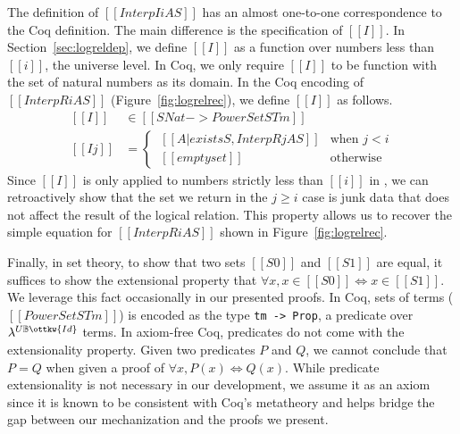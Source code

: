 \documentclass[acmsmall,screen=true,
\ifpublic review=false\else,review=true\fi
  ,anonymous=\ifanonymous true\else false\fi]{acmart}
\newcommand{\lang}{$\lambda^{U\mathbb{B}\ottkw{Id}}$\xspace}
\begin{document}
The definition of $[[Interp I i A S]]$ has an almost one-to-one
correspondence to the Coq definition. The main difference is the
specification of $[[I]]$. In
Section~\ref{sec:logreldep}, we define $[[I]]$ as a function over
numbers less than $[[i]]$, the universe level. In Coq, we only require
$[[I]]$ to be function with the set of natural numbers as its domain.
In the Coq encoding of $[[InterpR i A S]]$ (Figure~\ref{fig:logrelrec}), we define $[[I]]$ as follows.
\begin{equation*}
  \begin{split}
    [[I]]   &\in [[SNat -> PowerSet STm]] \\
    [[I j]] &=
     \begin{cases}
      \ [[{A | exists S , InterpR j A S}]] & \text{when } j < i \\
      \ [[emptyset]] & \text{otherwise}
    \end{cases}
  \end{split}
\end{equation*}
Since $[[I]]$ is only applied to numbers strictly less than $[[i]]$ in
, we can retroactively show that the set we return in the $j
\geq i$ case is junk data that does not affect the result of the logical
relation. This property allows us to recover the simple equation for $[[InterpR i A S]]$ shown in Figure~\ref{fig:logrelrec}.

Finally, in set theory, to show that two sets $[[S0]]$ and $[[S1]]$
are equal, it suffices to show the extensional property that $\forall
x, x \in [[S0]] \iff x \in [[S1]]$. We leverage this fact
occasionally in our presented proofs.
In Coq, sets of terms ($[[PowerSet STm]]$) is encoded as the type \texttt{tm ->
Prop}, a predicate over \lang{} terms.
In axiom-free Coq, predicates do not come with the extensionality
property. Given two predicates $P$ and $Q$, we cannot conclude that
$P = Q$ when given a proof of $\forall
x, P(x) \iff Q(x)$. While
predicate extensionality is not necessary in our development, we
assume it as an axiom since it is known to be consistent with Coq's
metatheory and helps bridge the gap between our mechanization and the
proofs we present.


\end{document}

